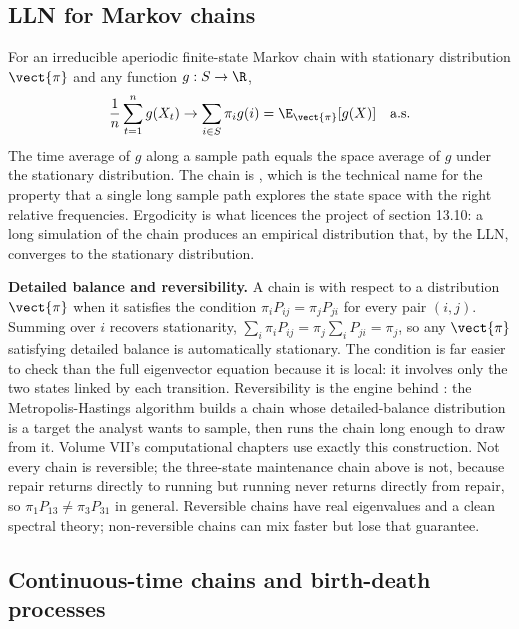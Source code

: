 

\subsection{LLN for Markov chains}

For an irreducible aperiodic finite-state Markov chain with
stationary distribution $\vect{\pi}$ and any function $g : S \to \R$,
\[
\frac{1}{n} \sum_{t=1}^{n} g(X_{t}) \to \sum_{i \in S}
\pi_{i} g(i) = \E_{\vect{\pi}}[g(X)] \quad\text{a.s.}
\]
The time average of $g$ along a sample path equals the space
average of $g$ under the stationary distribution. The chain is
, which is the technical name for the property
that a single long sample path explores the state space with the
right relative frequencies. Ergodicity is what licences the project
of section 13.10: a long simulation of the chain produces an
empirical distribution that, by the LLN, converges to the
stationary distribution.

\begin{mastery}
\textbf{Detailed balance and reversibility.} A chain is
 with respect to a distribution $\vect{\pi}$
when it satisfies the  condition
$\pi_{i} P_{ij} = \pi_{j} P_{ji}$ for every pair $(i, j)$. Summing
over $i$ recovers stationarity, $\sum_{i} \pi_{i} P_{ij} = \pi_{j}
\sum_{i} P_{ji} = \pi_{j}$, so any $\vect{\pi}$ satisfying detailed
balance is automatically stationary. The condition is far easier to
check than the full eigenvector equation because it is local: it
involves only the two states linked by each transition. Reversibility
is the engine behind : the
Metropolis-Hastings algorithm builds a chain whose detailed-balance
distribution is a target the analyst wants to sample, then runs the
chain long enough to draw from it. Volume VII's computational
chapters use exactly this construction. Not every chain is
reversible; the three-state maintenance chain above is not, because
repair returns directly to running but running never returns
directly from repair, so $\pi_{1} P_{13} \neq \pi_{3} P_{31}$ in
general. Reversible chains have real eigenvalues and a clean spectral
theory; non-reversible chains can mix faster but lose that
guarantee.
\end{mastery}

\subsection{Continuous-time chains and birth-death processes}

